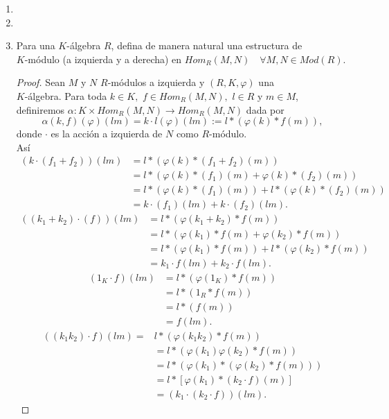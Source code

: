 \documentclass{article}
\newcommand{\La}{\mathscr{L}}
\theoremstyle{definition}
\theoremstyle{plain}
\theoremstyle{plain}
\theoremstyle{definition}
\theoremstyle{definition}
\theoremstyle{definition}
\theoremstyle{definition}
\theoremstyle{definition}
\theoremstyle{definition}
\begin{document}
\begin{enumerate}[label=\textbf{Ej \arabic*.}]
\begin{proof}
  Como $M\neq 0$ tenemos que para cada $ N\in \La(M)-\{0\}$ la inclusión $i_N:N\longrightarrow M$
  es morfismo y más aun $i_N\neq 0$. Entonces por f) se tiene que $N=Im(i_N)=M$ y así $\La(M)=\{0,M\}$. 
 \end{proof}
 
\item
\item
\item Para una $K$-álgebra $R$, defina de manera natural una estructura de \\ $K$-módulo (a izquierda y a derecha)
 en $Hom_R(M,N)\quad \forall M,N\in Mod(R).$
\begin{proof}
 Sean $M$ y $N$ $R$-módulos a izquierda y $(R,K,\varphi)$ una \\
 $K$-álgebra. Para toda $k\in K,\,\, f\in Hom_R(M,N),\,\, l\in R$ y $m\in M$, definiremos 
 $\alpha:K\times Hom_R(M,N)\longrightarrow Hom_R(M,N)$ dada por 
\[\alpha(k,f)(\varphi)(lm)=k\cdot l(\varphi)(lm):=l*(\varphi(k)*f(m)),\]
 donde $\cdot$ es la acción a izquierda de $N$ como $R$-módulo.\\
 Así \\
 \begin{align*}
( k\cdot(f_1+f_2))(lm)
 &=l*(\varphi(k)*(f_1+f_2)(m))\\
 &=l*(\varphi(k)*(f_1)(m)+\varphi(k)*(f_2)(m))\\
 &=l*(\varphi(k)*(f_1)(m))+l*(\varphi(k)*(f_2)(m))\\
 &=k\cdot(f_1)(lm)+k\cdot(f_2)(lm). 
  \end{align*}
  \begin{align*}
 ((k_1+k_2)\cdot(f))(lm)
 &=l*(\varphi(k_1+k_2)*f(m))\\
 &=l*(\varphi(k_1)*f(m)+\varphi(k_2)*f(m))\\
 &=l*(\varphi(k_1)*f(m))+l*(\varphi(k_2)*f(m))\\
 &=k_1\cdot f(lm)+k_2\cdot f(lm).
  \end{align*}
\begin{align*}
(1_K\cdot f)(lm)&=l*(\varphi(1_K)*f(m))\\
&=l*(1_R*f(m))\\
&=l*(f(m))\\
&=f(lm).
\end{align*}
\begin{align*}
((k_1k_2)\cdot f)(lm)=&l*(\varphi(k_1k_2)*f(m))\\
&=l*(\varphi(k_1)\varphi(k_2)*f(m))\\
&=l*(\varphi(k_1)*(\varphi(k_2)*f(m)))\\
&=l*[\varphi(k_1)*(k_2\cdot f)(m)]\\
&=(k_1\cdot(k_2\cdot f))(lm).
\end{align*}


\end{proof}
\end{enumerate}
\end{document}
